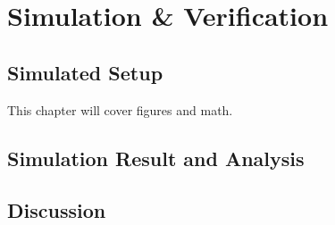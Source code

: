 \chapter{Simulation \& Verification}

\section{Simulated Setup}
This chapter will cover figures and math. 

\section{Simulation Result and Analysis}

\section{Discussion}


